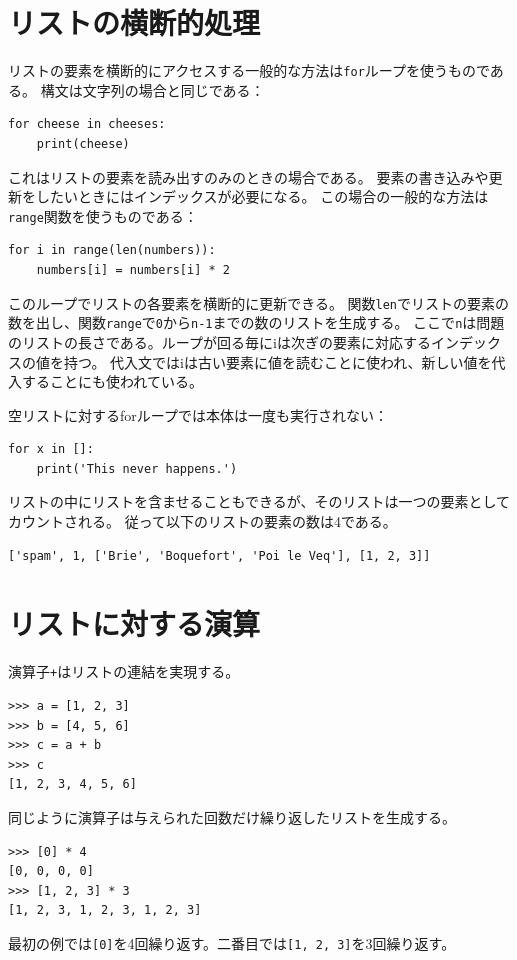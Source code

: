 \documentclass[a4j,12pt,makeidx]{jbook}
\begin{document}
\section{リストの横断的処理}
リストの要素を横断的にアクセスする一般的な方法は{\tt for}ループを使うものである。
構文は文字列の場合と同じである：
\begin{verbatim}
for cheese in cheeses:
    print(cheese)
\end{verbatim}
これはリストの要素を読み出すのみのときの場合である。
要素の書き込みや更新をしたいときにはインデックスが必要になる。
この場合の一般的な方法は{\tt range}関数を使うものである：
\begin{verbatim}
for i in range(len(numbers)):
    numbers[i] = numbers[i] * 2
\end{verbatim}
このループでリストの各要素を横断的に更新できる。
関数{\tt len}でリストの要素の数を出し、関数{\tt range}で{\tt 0}から{\tt n-1}までの数のリストを生成する。
ここで{\tt n}は問題のリストの長さである。ループが回る毎にiは次ぎの要素に対応するインデックスの値を持つ。
代入文ではiは古い要素に値を読むことに使われ、新しい値を代入することにも使われている。\par
空リストに対するforループでは本体は一度も実行されない：
\begin{verbatim}
for x in []:
    print('This never happens.')
\end{verbatim} \par
リストの中にリストを含ませることもできるが、そのリストは一つの要素としてカウントされる。
従って以下のリストの要素の数は4である。
\begin{verbatim}
['spam', 1, ['Brie', 'Boquefort', 'Poi le Veq'], [1, 2, 3]]
\end{verbatim}
%
\section{リストに対する演算}
演算子{\tt +}はリストの連結を実現する。
\begin{verbatim}
>>> a = [1, 2, 3]
>>> b = [4, 5, 6]
>>> c = a + b
>>> c
[1, 2, 3, 4, 5, 6]
\end{verbatim}
同じように演算子{\tt *}は与えられた回数だけ繰り返したリストを生成する。
\begin{verbatim}
>>> [0] * 4
[0, 0, 0, 0]
>>> [1, 2, 3] * 3
[1, 2, 3, 1, 2, 3, 1, 2, 3]
\end{verbatim}
最初の例では{\tt [0]}を4回繰り返す。二番目では{\tt [1, 2, 3]}を3回繰り返す。
%
\end{document}
